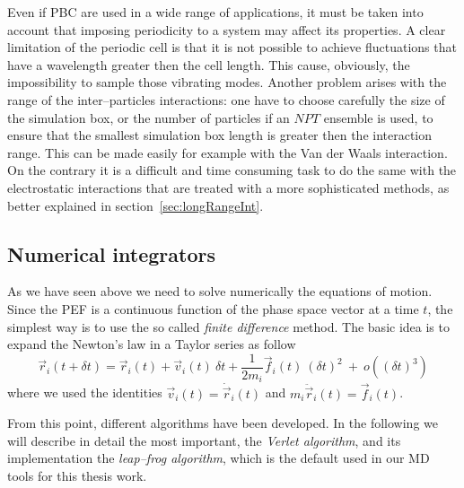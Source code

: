 Even if \ac{PBC} are used in a wide range of applications, it must be taken into account that imposing
periodicity to a system may affect its properties. A clear limitation of the periodic cell is that it is not
possible to achieve fluctuations that have a wavelength greater then the cell length. This cause, obviously, the
impossibility to sample those vibrating modes. Another problem arises with the range of the inter--particles
interactions: one have to choose carefully the size of the simulation box, or the number of particles if an $NPT$
ensemble is used, to ensure that the smallest simulation box length is greater then the interaction range. This
can be made easily for example with the Van der Waals interaction. On the contrary it is a difficult and time
consuming task to do the same with the electrostatic interactions that are treated with a more sophisticated
methods, as better explained in section~\ref{sec:longRangeInt}.

\subsection{Numerical integrators}
As we have seen above we need to solve numerically the equations of motion. Since the \ac{PEF} is a continuous
function of the phase space vector at a time $t$, the simplest way is to use the so called \textit{finite
difference} method. The basic idea is to expand the Newton's law in a Taylor series as follow
\begin{equation}
	\vec r_i(t + \delta t) = \vec r_i(t) + \vec v_i(t)\ \delta t + \frac{1}{2m_i}\vec f_i(t)\ (\delta t)^2\ +\ o((\delta t)^3)
	\label{eq:newtonTaylor}
\end{equation}
where we used the identities $\vec v_i(t) = \dot{\vec r}_i(t)$ and $m_i\ddot{\vec r}_i(t) = \vec f_i(t)$.

From this point, different algorithms have been developed. In the following we will describe in detail the most
important, the \textit{Verlet algorithm}, and its implementation the \textit{leap--frog algorithm}, which is the
default used in our \ac{MD} tools for this thesis work.

